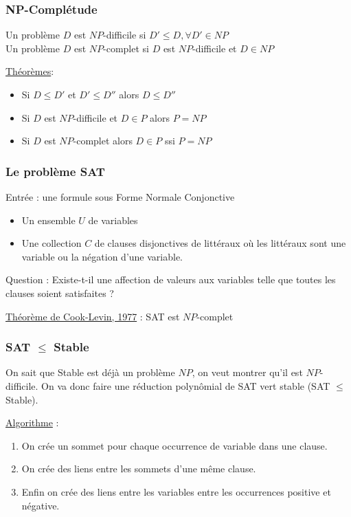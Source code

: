 \documentclass{article}
\theoremstyle{plain}
\begin{document}
      \subsubsection{NP-Complétude}

      Un problème $D$ est $NP$-difficile si $D' \leq D, \forall D' \in NP$ \\
      Un problème $D$ est $NP$-complet si $D$ est $NP$-difficile et $D \in NP$

      \underline{Théorèmes}:
      \begin{itemize}
        \item Si $D \leq D'$ et $D' \leq D''$ alors $D \leq D''$
        \item Si $D$ est $NP$-difficile et $D \in P$ alors $P = NP$
        \item Si $D$ est $NP$-complet alors $D \in P$ ssi $P = NP$
      \end{itemize}

      \subsubsection{Le problème SAT}

      Entrée : une formule sous Forme Normale Conjonctive
      \begin{itemize}
        \item Un ensemble $U$ de variables
        \item Une collection $C$ de clauses disjonctives de littéraux où les
          littéraux sont une variable ou la négation d'une variable.
      \end{itemize}
      Question : Existe-t-il une affection de valeurs aux variables telle que
      toutes les clauses soient satisfaites ?

      \underline{Théorème de Cook-Levin, 1977} : SAT est $NP$-complet

      \subsubsection{SAT $\leq$ Stable}

        On sait que Stable est déjà un problème $NP$, on veut montrer qu'il est
        $NP$-difficile. On va donc faire une réduction polynômial de SAT vert
        stable (SAT $\leq$ Stable).

        \underline{Algorithme} :

        \begin{enumerate}
          \item On crée un sommet pour chaque occurrence de variable dans une
            clause.
          \item On crée des liens entre les sommets d'une même clause.
          \item Enfin on crée des liens entre les variables entre les
            occurrences positive et négative.
        \end{enumerate}
\end{document}
